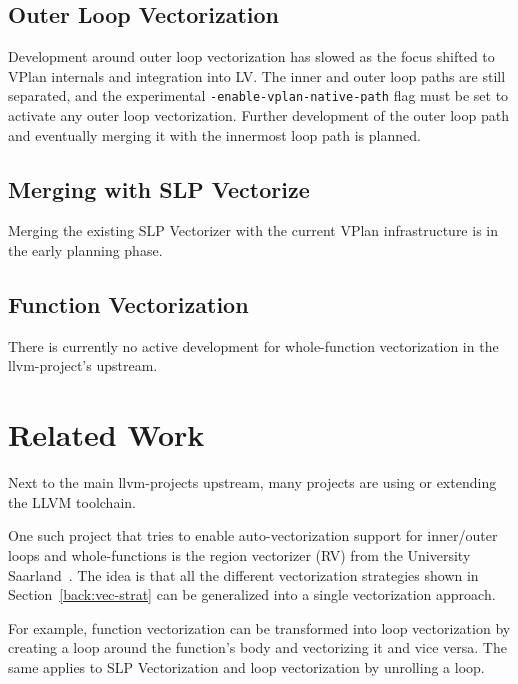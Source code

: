 \documentclass[sigplan,11pt,nonacm]{acmart}
\begin{document}
\subsection{Outer Loop Vectorization}
Development around outer loop vectorization has slowed as the focus shifted to VPlan internals 
and integration into LV. The inner and outer loop paths are still separated, and the 
experimental \texttt{-enable-\allowbreak vplan-\allowbreak native-\allowbreak path} flag must be 
set to activate any outer 
loop vectorization. Further development of the outer loop path and eventually merging it 
with the innermost loop path is planned.

\subsection{Merging with SLP Vectorize}
Merging the existing SLP Vectorizer with the current VPlan infrastructure is in the early planning phase.

\subsection{Function Vectorization}
There is currently no active development for whole-function vectorization in the
llvm-project's upstream.




\section{Related Work}
\label{sec:relatedwork}
Next to the main llvm-projects upstream, many projects are using or extending the LLVM toolchain.

One such project that tries to enable auto-vectorization support for inner/outer loops and 
whole-functions is the region vectorizer (RV) from the University Saarland~\cite{rv}.
The idea is that all the different vectorization strategies shown in Section~\ref{back:vec-strat}
can be generalized into a single vectorization approach.

For example, function vectorization can be transformed into loop vectorization by creating a loop 
around the function's body and vectorizing it and vice versa. 
The same applies to SLP Vectorization and loop vectorization by unrolling a loop.
\end{document}
